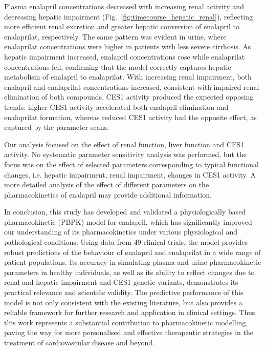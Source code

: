 Plasma enalapril concentrations decreased with increasing renal activity and decreasing hepatic impairment (Fig.~\ref{fig:timecourse_hepatic_renal}), reflecting more efficient renal excretion and greater hepatic conversion of enalapril to enalaprilat, respectively. The same pattern was evident in urine, where enalaprilat concentrations were higher in patients with less severe cirrhosis. As hepatic impairment increased, enalapril concentrations rose while enalaprilat concentrations fell, confirming that the model correctly captures hepatic metabolism of enalapril to enalaprilat. With increasing renal impairment, both enalapril and enalaprilat concentrations increased, consistent with impaired renal elimination of both compounds. CES1 activity produced the expected opposing trends: higher CES1 activity accelerated both enalapril elimination and enalaprilat formation, whereas reduced CES1 activity had the opposite effect, as captured by the parameter scans.

Our analysis focused on the effect of renal function, liver function and CES1 activity. No systematic parameter sensitivity analysis was performed, but the focus was on the effect of selected parameters corresponding to typical functional changes, i.e. hepatic impairment, renal impairment, changes in CES1 activity. A more detailed analysis of the effect of different parameters on the pharmacokinetics of enalapril may provide additional information.

In conclusion, this study has developed and validated a physiologically based pharmacokinetic (PBPK) model for enalapril, which has significantly improved our understanding of its pharmacokinetics under various physiological and pathological conditions. Using data from 49 clinical trials, the model provides robust predictions of the behaviour of enalapril and enalaprilat in a wide range of patient populations. Its accuracy in simulating plasma and urine pharmacokinetic parameters in healthy individuals, as well as its ability to reflect changes due to renal and hepatic impairment and CES1 genetic variants, demonstrates its practical relevance and scientific validity. The predictive performance of this model is not only consistent with the existing literature, but also provides a reliable framework for further research and application in clinical settings. Thus, this work represents a substantial contribution to pharmacokinetic modelling, paving the way for more personalised and effective therapeutic strategies in the treatment of cardiovascular disease and beyond.